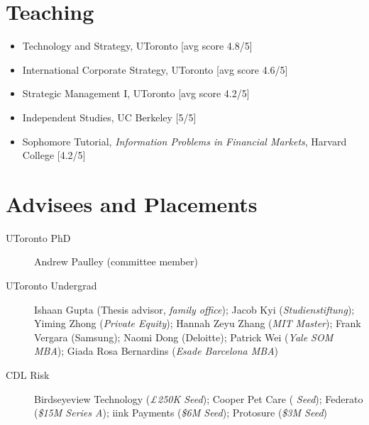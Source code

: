 \vspace{0.05cm}
\section*{Teaching}
\begin{itemize}
    \item[2023-\text{ }\text{ }\text{ }] Technology and Strategy, UToronto [avg score 4.8/5]
    \item[2022-\text{ }\text{ }\text{ }] International Corporate Strategy, UToronto [avg score 4.6/5]
    \item[2022-\text{ }\text{ }\text{ }] Strategic Management I, UToronto [avg score 4.2/5]
    \item[2019 \text{ }\text{ }\text{ }] Independent Studies, UC Berkeley [5/5]
    \item[2015 \text{ }\text{ }\text{ }] Sophomore Tutorial, \textit{Information Problems in Financial Markets}, Harvard College [4.2/5]
\end{itemize}

\vspace{0.05cm}
\section*{Advisees and Placements}
\begin{description}
    \item[UToronto PhD] Andrew Paulley (committee member)%
    \item[UToronto Undergrad] Ishaan Gupta (Thesis advisor, \textit{family office}); Jacob Kyi (\textit{Studienstiftung}); Yiming Zhong (\textit{Private Equity}); Hannah Zeyu Zhang (\textit{MIT Master}); Frank Vergara (Samsung); Naomi Dong (Deloitte); Patrick Wei (\textit{Yale SOM MBA}); Giada Rosa Bernardins (\textit{Esade Barcelona MBA})
    \item[CDL Risk] Birdseyeview Technology (\textit{\pounds250K Seed}); Cooper Pet Care (\textit{ Seed}); Federato (\textit{\$15M Series A}); iink Payments (\textit{\$6M Seed}); Protosure (\textit{\$3M Seed})
\end{description}

\vspace{0.05cm}
